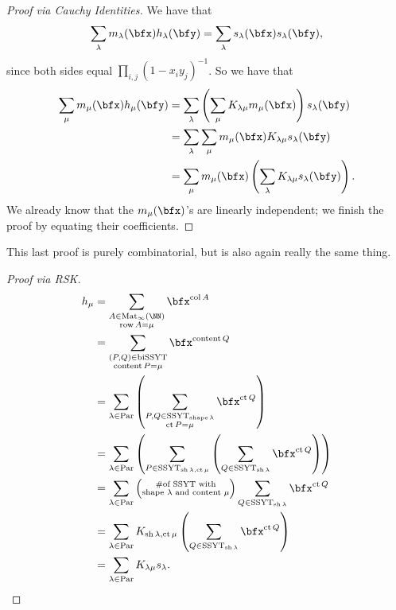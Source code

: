 \documentclass{article}
\DeclareMathOperator{\row}{row}
\DeclareMathOperator{\col}{col}
\DeclareMathOperator{\shape}{shape}
\DeclareMathOperator{\sh}{sh}
\DeclareMathOperator{\content}{content}
\DeclareMathOperator{\ct}{ct}
\DeclareMathOperator{\Par}{Par}
\DeclareMathOperator{\SSYT}{SSYT}
\DeclareMathOperator{\biSSYT}{biSSYT}
\DeclareMathOperator{\Mat}{Mat}
\begin{document}
\begin{proof}[Proof via Cauchy Identities]
    We have that
    \[
        \sum_\lambda 
        m_\lambda(\bfx) h_\lambda(\bfy) 
        = 
        \sum_\lambda 
        s_\lambda(\bfx) s_\lambda(\bfy),
    \]
    since both sides equal $\prod_{i,j}(1-x_iy_j)^{-1}$.
    So we have that
    \begin{align*}
        \sum_\mu 
        m_\mu(\bfx)h_\mu(\bfy) 
        &= 
        \sum_\lambda 
        \left( 
            \sum_\mu K_{\lambda\mu} m_\mu(\bfx) 
        \right) 
        s_\lambda(\bfy) 
        \\
        &= 
        \sum_\lambda \sum_\mu 
        m_\mu(\bfx) K_{\lambda\mu} s_\lambda(\bfy) \\
        &= 
        \sum_\mu 
        m_\mu(\bfx) 
        \left(\sum_\lambda K_{\lambda\mu} s_\lambda(\bfy)\right).
    \end{align*}
    We already know that the $m_\mu(\bfx)$'s are linearly independent; we finish the proof by equating their coefficients.
\end{proof}

This last proof is purely combinatorial, but is also again really the same thing. 

\begin{proof}[Proof via RSK]
    \begin{align*}
        h_\mu 
        &= 
        \sum_{\substack{A\in\Mat_\infty(\NN)\\\row A=\mu}} 
        \bfx^{\col A}
        \\
        &=
        \sum_{\substack{(P,Q)\in\biSSYT\\\content P=\mu}} 
        \bfx^{\content Q}
        \\
        &=
        \sum_{\lambda\in\Par}
        \left(
            \sum_{\substack{P,Q\in\SSYT_{\shape \lambda}\\\ct P=\mu}} 
            \bfx^{\ct Q}
        \right)
        \\
        &=
        \sum_{\lambda\in\Par}
        \left(
            \sum_{P\in\SSYT_{\sh \lambda, \ct \mu}} 
            \left(
                \sum_{Q\in\SSYT_{\sh \lambda}} \bfx^{\ct Q}
            \right)
        \right) 
        \\
        &=
        \sum_{\lambda\in\Par}
        \left(
            \substack{\#\text{of SSYT with}\\\text{shape $\lambda$ and content $\mu$}}
        \right)
        \sum_{Q\in\SSYT_{\sh \lambda}} 
        \bfx^{\ct Q} 
        \\
        &= 
        \sum_{\lambda\in\Par} 
        K_{\sh\lambda,\ct\mu} 
        \left(\sum_{Q\in\SSYT_{\sh \lambda}} \bfx^{\ct Q}\right) 
        \\
        &= \sum_{\lambda\in\Par} K_{\lambda\mu} s_\lambda.
    \end{align*}
\end{proof}
\end{document}

